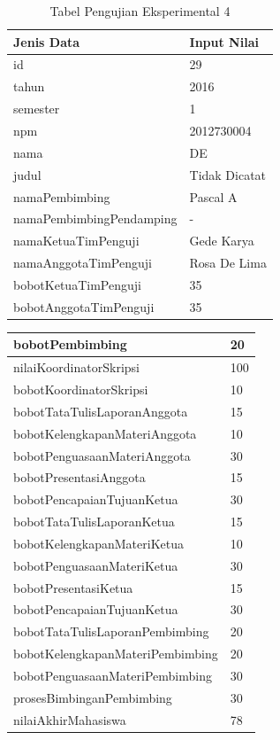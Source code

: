 	\begin{table}[H]
		\centering
		\caption{Tabel Pengujian Eksperimental 4}
		\begin{tabular}{| m{7cm} | m{5cm} |}
			\hline
			Jenis Data & Input Nilai\\
			\hline
			id & 29\\
			\hline
			tahun & 2016\\
			\hline
			semester & 1\\
			\hline
			npm & 2012730004\\
			\hline
			nama & DE\\
			\hline
			judul & Tidak Dicatat \\
			\hline
			namaPembimbing & Pascal A\\
			\hline
			namaPembimbingPendamping & -\\
			\hline
			namaKetuaTimPenguji & Gede Karya\\
			\hline
			namaAnggotaTimPenguji & Rosa De Lima\\
			\hline
			bobotKetuaTimPenguji & 35\\
			\hline
			bobotAnggotaTimPenguji & 35\\
			\hline
		\end{tabular}
	\end{table}
\begin{table}[H]
\centering
\begin{tabular}{| m{7cm} | m{5cm} |}
\hline
			bobotPembimbing & 20\\
			\hline
			nilaiKoordinatorSkripsi & 100\\
			\hline
			bobotKoordinatorSkripsi & 10\\
			\hline
			bobotTataTulisLaporanAnggota & 15\\
			\hline
			bobotKelengkapanMateriAnggota & 10\\
			\hline
			bobotPenguasaanMateriAnggota & 30\\
			\hline
			bobotPresentasiAnggota & 15\\
			\hline
			bobotPencapaianTujuanKetua & 30\\
			\hline
			bobotTataTulisLaporanKetua & 15\\
			\hline
			bobotKelengkapanMateriKetua & 10\\
			\hline
			bobotPenguasaanMateriKetua & 30\\
			\hline
			bobotPresentasiKetua & 15\\
			\hline
			bobotPencapaianTujuanKetua & 30\\
			\hline
			bobotTataTulisLaporanPembimbing & 20\\
			\hline
			bobotKelengkapanMateriPembimbing &20\\
			\hline
			bobotPenguasaanMateriPembimbing & 30\\
			\hline
			prosesBimbinganPembimbing & 30\\
			\hline
			nilaiAkhirMahasiswa & 78\\
			\hline
		\end{tabular}
	\end{table}
